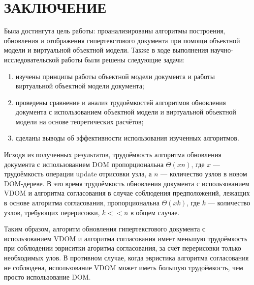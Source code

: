 \section*{ЗАКЛЮЧЕНИЕ}

Была достингута цель работы: проанализированы алгоритмы построения, обновления и отображения гипертекстового документа при помощи объектной модели и виртуальной объектной модели.
Также в ходе выполнения научно-исследовательской работы были решены следующие задачи: 
\begin{enumerate}[label=\arabic*)]
	\item изучены принципы работы объектной модели документа и работы виртуальной объектной модели документа;
	\item проведены сравнение и анализ трудоёмкостей алгоритмов обновления документа с использованием объектной модели и виртуальной объектной модели на основе теоретических расчётов;
	\item сделаны выводы об эффективности использования изученных алгоритмов.
\end{enumerate}

Исходя из полученных результатов, трудоёмкость алгоритма обновления документа с использованием DOM пропорциональна $\Theta(xn)$, где $x$ --- трудоёмкость операции update отрисовки узла, а $n$ --- количество узлов в новом DOM-дереве.
В это время трудоёмкость обновления документа с использованием VDOM и алгоритма согласования в случае соблюдения предположений, лежащих в основе алгоритма согласования, пропорциональна $\Theta(xk)$, где $k$ --- количество узлов, требующих перерисовки, $k << n$ в общем случае.

Таким образом, алгоритм обновления гипертекстового документа с использованием VDOM и алгоритма согласования имеет меньшую трудоёмкость при соблюдении эвриситки агоритма согласования, за счёт перерисовки только необходимых улов.
В противном случае, когда эвристика алгоритма согласования не соблюдена, использование VDOM может иметь большую трудоёмкость, чем просто использование DOM.

\pagebreak